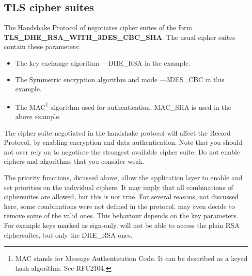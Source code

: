 \subsection{TLS cipher suites}
\par 
The Handshake Protocol of \tlsI{} negotiates cipher suites 
of the form \\
{\bf TLS\_DHE\_RSA\_WITH\_3DES\_CBC\_SHA}.
The usual cipher suites contain these parameters:
\begin{itemize}
\item The key exchange algorithm ---DHE\_RSA in the example.
\item The Symmetric encryption algorithm and mode ---3DES\_CBC in this
example.
\item The MAC\footnote{MAC stands for Message Authentication Code. It can
be described as a keyed hash algorithm. See RFC2104.} algorithm used for authentication.
MAC\_SHA is used in the above example.
\end{itemize}

The cipher suite negotiated in the handshake protocol will affect
the Record Protocol, by enabling encryption and data authentication.
Note that you should not over rely on \tls{} to negotiate the strongest 
available cipher suite. Do not enable ciphers and algorithms that you consider weak.
\par
The priority functions, dicussed above, allow the application layer to enable
and set priorities on the individual ciphers. It may imply that all combinations of ciphersuites
are allowed, but this is not true. For several reasons, not discussed here, some combinations 
were not defined in the \tls{} protocol.
\gnutls{} may even decide to remove some of the valid ones. This behaviour depends on the
key parameters. For example keys marked as sign-only, will not be able to
access the plain RSA ciphersuites, but only the DHE\_RSA ones.

\addvspace{1.5cm}
